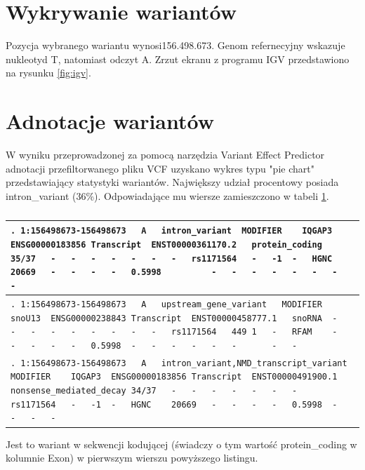\documentclass[a4paper]{article}
\begin{document}
\section{Wykrywanie wariantów}  
 Pozycja wybranego wariantu wynosi156.498.673. Genom refernecyjny wskazuje nukleotyd T, natomiast odczyt A.
 Zrzut ekranu z programu IGV przedstawiono na rysunku \ref{fig:igv}.

\section{Adnotacje wariantów}  
W wyniku przeprowadzonej za pomocą narzędzia Variant Effect Predictor adnotacji przefiltorwanego pliku VCF uzyskano wykres typu "pie chart" przedstawiający statystyki wariantów. Największy udział procentowy posiada intron\_variant (36\%). Odpowiadające mu wiersze zamieszczono w tabeli \ref{table:3lines}.

\begin{table}[H]
    \caption{
    \label{table:3lines}
    }
\begin{center}
\begin{tabular}{| p{150mm} |}

    \hline
    \verb|.	1:156498673-156498673	A	intron_variant	MODIFIER	IQGAP3	ENSG00000183856	Transcript	ENST00000361170.2	protein_coding	35/37	-	-	-	-	-	-	-	rs1171564	-	-1	-	HGNC	20669	-	-	-	-	0.5998	 		-	-	-	-	-	-	-	-|
    \\
    \hline
\verb|.	1:156498673-156498673	A	upstream_gene_variant	MODIFIER	snoU13	ENSG00000238843	Transcript	ENST00000458777.1	snoRNA	-	-	-	-	-	-	-	-	-	rs1171564	449	1	-	RFAM	-	-	-	-	-	0.5998	-	-	-	-	-	-		-	-|
    \\
    \hline
\verb|.	1:156498673-156498673	A	intron_variant,NMD_transcript_variant	MODIFIER	IQGAP3	ENSG00000183856	Transcript	ENST00000491900.1	nonsense_mediated_decay	34/37	-	-	-	-	-	-	-	rs1171564	-	-1	-	HGNC	20669	-	-	-	-	0.5998	-	-	-	-|
    \\
    \hline
\end{tabular}
\end{center}
\end{table}

Jest to wariant w sekwencji kodującej (świadczy o tym wartość protein\_coding w kolumnie Exon) w pierwszym wierszu powyższego listingu.
\end{document}
